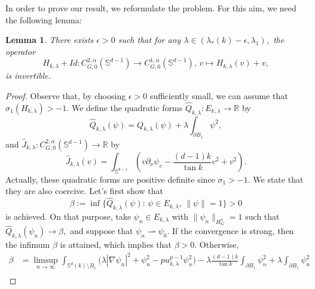 \documentclass[reqno]{amsart}
\newtheorem{lemma}[theorem]{Lemma}
\def\S{\mathbb S}
\numberwithin{equation}{section}
\newenvironment{key words}{\textbf{Keywords}\mbox{  }}{ }
\begin{document}
    In order to prove our result, we reformulate the problem. For this aim, we need the following lemma:
     \begin{lemma} \label{le42}
    There exists $\epsilon>0$ such that for any $\lambda\in(\lambda_{*}(k)-\epsilon,\lambda_{1}),$ the operator
     \[H_{k, \lambda}+Id:C^{2,\alpha}_{G,0}(\S^{ d-1})\rightarrow C^{1,\alpha}_{G,0}(\S^{ d-1}),\,v\mapsto H_{k, \lambda}(v)+v, \]
     is invertible.
     \end{lemma}
     \begin{proof}
 { Observe that, by choosing $\epsilon>0$ sufficiently small, we can assume that $\sigma_1(H_{k, \lambda}) > -1$.} %
     We define the quadratic forms $\hat{Q}_{k,\lambda}:E_{k,\lambda}\rightarrow\mathbb{R}$ by
     \[\hat{Q}_{k,\lambda}(\psi)=Q_{k,\lambda}(\psi)+\lambda\int_{\partial B_{1}}\psi^{2},\]
    and $\hat{J}_{k,\lambda}:C^{2,\alpha}_{G,0}(\S^{ d-1})\rightarrow\mathbb{R}$ by
     \[\hat{J}_{k,\lambda}(v)= \int_{\S^{ d-1}} \left( v\partial_{\nu}\psi_{v}-\frac{(d-1)k}{\tan k}v^2+ v^{2}\right).\]
      Actually, these quadratic forms are positive definite since $\sigma_1>-1$. We state that they are also coercive. Let's first show that
     \[\beta:=\inf\{\hat{Q}_{k,\lambda}(\psi):\, \psi\in E_{k,\lambda},\,\|\psi\|=1\}>0\]
     is achieved. On that purpose, take $\psi_{n}\in E_{k,\lambda}$ with $\|\psi_{n}\|_{H_{G}^1}=1$ such that $\hat{Q}_{k,\lambda}(\psi_{n})\rightarrow\beta,$ and suppose that $\psi_{n}\rightharpoonup\psi_{0}.$ If the convergence is strong, then the infimum $\beta$ is attained, which implies that $\beta>0.$ Otherwise,
    \begin{align*}
    \beta &=\mathop{\limsup}\limits_{n\rightarrow\infty}\int_{\S^{d}(k)\setminus B_{1}}\big(\lambda|\nabla\psi_{n}|^{2}
     +\psi_{n}^{2}-pu_{k,\lambda}^{p-1}\psi_{n}^{2}\big)-\lambda\frac{(d-1)k}{\tan k}\int_{\partial B_{1}}\psi_{n}^{2}+ \lambda\int_{\partial B_{1}}\psi_{n}^{2}\\

\end{align*}
\end{proof}
\end{document}
